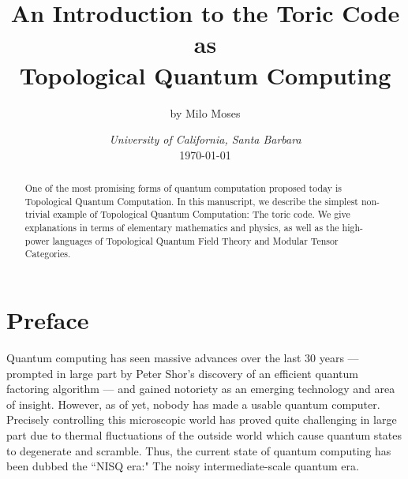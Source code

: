 \documentclass{article}
\title{An Introduction to the Toric Code as \\ Topological Quantum Computing}
\author{by Milo Moses}
\date{\textit{University of California, Santa Barbara} \\ [2ex] \today}
\theoremstyle{definition}
\numberwithin{figure}{section}
\begin{document}
\maketitle

\newcommand{\RR}{\mathbb{R}}
\newcommand{\HH}{\mathbb{H}}
\newcommand{\NN}{\mathbb{N}}
\newcommand{\QQ}{\mathbb{Q}}
\newcommand{\CC}{\mathbb{C}}
\newcommand{\FF}{\mathbb{F}}
\newcommand{\ZZ}{\mathbb{Z}}
\newcommand{\Ncal}{\mathcal{N}}
\newcommand{\LL}{\mathscr{L}}
\newcommand{\TT}{\mathcal{T}}
\newcommand{\Ccat}{\mathscr{C}}
\newcommand{\Dcat}{\mathscr{D}}
\newcommand{\st}{\,\,\mathrm{s.t}\,\,}
\newcommand{\mm}{\mathfrak{m}}
\newcommand{\pp}{\mathfrak{p}}
\newcommand{\Hom}{\mathrm{Hom}}
\newcommand{\Aut}{\mathrm{Aut}}
\newcommand{\Frac}{\mathrm{Frac}}
\newcommand{\tr}{\mathrm{tr}}
\newcommand{\res}{\mathrm{res}}
\newcommand{\coker}{\mathrm{coker}}
\newcommand{\SL}{\mathrm{SL}}
\newcommand{\End}{\mathrm{End}}
\newcommand{\Rep}{\bold{Rep}}
\newcommand{\Set}{\bold{Set}}
\newcommand{\Vecc}{\mathrm{Vec}}
\newcommand{\0}{\left|0\right>}
\newcommand{\1}{\left|1\right>}
\newcommand{\nullclass}{\left|\bold{0}\right>}
\newcommand{\alphaclass}{\left|\alpha\right>}
\newcommand{\betaclass}{\left|\beta\right>}
\newcommand{\alphabetaclass}{\left|\alpha\beta\right>}
\newcommand{\ppsi}{\left|\psi\right>}
\newcommand{\bigleadsto}{\mathlarger{\mathlarger{\mathlarger{\leadsto}}}}



\begin{abstract}
One of the most promising forms of quantum computation proposed today is Topological Quantum Computation. In this manuscript, we describe the simplest non-trivial example of Topological Quantum Computation: The toric code. We give explanations in terms of elementary mathematics and physics, as well as the high-power languages of Topological Quantum Field Theory and Modular Tensor Categories.
\end{abstract}

\newpage

\tableofcontents

\newpage

\section{Preface}
\label{Preface}

Quantum computing has seen massive advances over the last 30 years — prompted in large part by Peter Shor's discovery of an efficient quantum factoring algorithm \cite{shor1994algorithms} — and gained notoriety as an emerging technology and area of insight. However, as of yet, nobody has made a usable quantum computer. Precisely controlling this microscopic world has proved quite challenging in large part due to thermal fluctuations of the outside world which cause quantum states to degenerate and scramble. Thus, the current state of quantum computing has been dubbed the ``NISQ era:" The noisy intermediate-scale quantum era.
\end{document}
